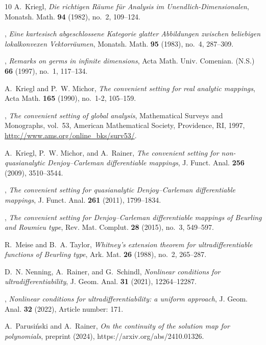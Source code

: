 \documentclass[10pt, reqno]{amsart}
\theoremstyle{plain}
\theoremstyle{definition}
\numberwithin{equation}{section}
\begin{document}
\begin{thebibliography}{10}
    A.~Kriegl, \emph{Die richtigen {R}\"aume f\"ur {A}nalysis im {U}nendlich-{D}imensionalen}, Monatsh. Math. \textbf{94} (1982), no.~2, 109--124.

    \bysame, \emph{Eine kartesisch abgeschlossene {K}ategorie glatter {A}bbildungen zwischen beliebigen lokalkonvexen {V}ektorr\"aumen}, Monatsh. Math. \textbf{95} (1983), no.~4, 287--309.

    \bysame, \emph{Remarks on germs in infinite dimensions}, Acta Math. Univ. Comenian. (N.S.) \textbf{66} (1997), no.~1, 117--134. 

    A.~Kriegl and P.~W. Michor, \emph{The convenient setting for real analytic mappings}, Acta Math. \textbf{165} (1990), no.~1-2, 105--159.

    \bysame, \emph{The convenient setting of global analysis}, Mathematical Surveys and Monographs, vol.~53, American Mathematical Society, Providence, RI, 1997, \url{http://www.ams.org/online\_bks/surv53/}.

    A.~Kriegl, P.~W. Michor, and A.~Rainer, \emph{The convenient setting for non-quasianalytic {D}enjoy--{C}arleman differentiable mappings}, J. Funct. Anal. \textbf{256} (2009), 3510--3544.

    \bysame, \emph{The convenient setting for quasianalytic {D}enjoy--{C}arleman differentiable mappings}, J. Funct. Anal. \textbf{261} (2011), 1799--1834.

    \bysame, \emph{The convenient setting for {D}enjoy--{C}arleman differentiable mappings of {B}eurling and {R}oumieu type}, Rev. Mat. Complut. \textbf{28} (2015), no.~3, 549--597.

    R.~Meise and B.~A. Taylor, \emph{Whitney's extension theorem for ultradifferentiable functions of {B}eurling type}, Ark. Mat. \textbf{26} (1988), no.~2, 265--287.

    D.~N. Nenning, A.~Rainer, and G.~Schindl, \emph{Nonlinear conditions for ultradifferentiability}, {J. Geom. Anal.} \textbf{31} (2021), 12264--12287. %

    \bysame, \emph{Nonlinear conditions for ultradifferentiability: a uniform approach}, {J. Geom. Anal.} \textbf{32} (2022), Article number: 171. %

    A.~{Parusi\'nski} and A.~{Rainer}, \emph{On the continuity of the solution map for polynomials}, preprint (2024), https://arxiv.org/abs/2410.01326.


\end{thebibliography}
\end{document}
